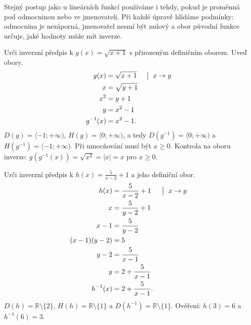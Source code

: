 \documentclass[11pt,a4paper]{article}
\begin{document}

Stejný postup jako u lineárních funkcí používáme i tehdy, pokud je proměnná pod odmocninou nebo ve jmenovateli. Při každé úpravě hlídáme podmínky: odmocnina je nezáporná, jmenovatel nesmí být nulový a obor původní funkce určuje, jaké hodnoty může mít inverze.

\begin{prikladReseniBox}[title={Příklad 1}]
Urči inverzní předpis k $g(x)=\sqrt{x+1}$ s přirozeným definičním oborem. Uveď obory.
\tcblower
\[
\begin{aligned}
g(x)&=\sqrt{x+1} &&\bigm|\ x\to y\\
x&=\sqrt{y+1}\\
x^2&=y+1\\
y&=x^2-1\\
g^{-1}(x)&=x^2-1.
\end{aligned}
\]
$D(g)=\langle-1;+\infty)$, $H(g)=\langle0;+\infty)$, a tedy $D(g^{-1})=\langle0;+\infty)$ a $H(g^{-1})=\langle-1;+\infty)$. Při umocňování musí být $x\ge0$. Kontrola na oboru inverze: $g(g^{-1}(x))=\sqrt{x^2}=|x|=x$ pro $x\ge0$.
\end{prikladReseniBox}

\begin{prikladReseniBox}[title={Příklad 2}]
Urči inverzní předpis k $h(x)=\frac{5}{x-2}+1$ a jeho definiční obor.
\tcblower
\[
\begin{aligned}
h(x)&=\frac{5}{x-2}+1 &&\bigm|\ x\to y\\
x&=\frac{5}{y-2}+1\\
x-1&=\frac{5}{y-2}\\
(x-1)(y-2)&=5\\
y-2&=\frac{5}{x-1}\\
y&=2+\frac{5}{x-1}\\
h^{-1}(x)&=2+\frac{5}{x-1}.
\end{aligned}
\]
$D(h)=\mathbb R\setminus\{2\}$, $H(h)=\mathbb R\setminus\{1\}$ a $D(h^{-1})=\mathbb R\setminus\{1\}$. Ověření: $h(3)=6$ a $h^{-1}(6)=3$.
\end{prikladReseniBox}
\end{document}
